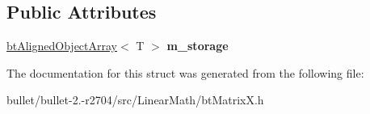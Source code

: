 \subsection*{Public Attributes}
\begin{DoxyCompactItemize}
\item 
\hypertarget{structbt_vector_x_a8680d0d305babc030c4aabbeaf6e6d58}{\hyperlink{classbt_aligned_object_array}{bt\+Aligned\+Object\+Array}$<$ T $>$ {\bfseries m\+\_\+storage}}\label{structbt_vector_x_a8680d0d305babc030c4aabbeaf6e6d58}

\end{DoxyCompactItemize}


The documentation for this struct was generated from the following file\+:\begin{DoxyCompactItemize}
\item 
bullet/bullet-\/2.-\/r2704/src/\+Linear\+Math/bt\+Matrix\+X.\+h\end{DoxyCompactItemize}
